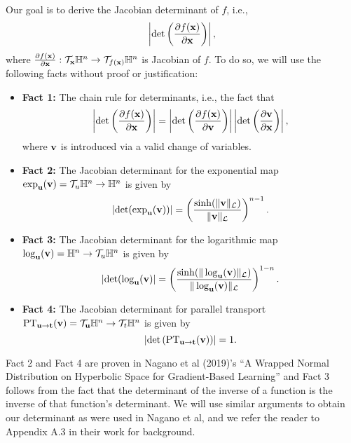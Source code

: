 Our goal is to derive the Jacobian determinant of $f$, i.e., 
\begin{equation}
    \left|\textrm{det}\left(\frac{\partial f(\mathbf{x})}{\partial \mathbf{x}}\right)\right|,
\end{equation}
where $\frac{\partial f(\mathbf{x})}{\partial \mathbf{x}} : \mathcal{T}_{\mathbf{x}}\mathbb{H}^n \rightarrow \mathcal{T}_{f(\mathbf{x})}\mathbb{H}^n$ is Jacobian of $f$.
To do so, we will use the following facts without proof or justification:
\begin{itemize}
    \item 
    \textbf{Fact 1: }The chain rule for determinants, i.e., the fact that
    \begin{equation}
        \left|\textrm{det}\left(\frac{\partial f(\mathbf{x})}{\partial \mathbf{x}}\right)\right| =  \left|\textrm{det}\left(\frac{\partial f(\mathbf{x})}{\partial \mathbf{v}}\right)\right| \left|\textrm{det}\left(\frac{\partial \mathbf{v}}{\partial \mathbf{x}}\right)\right|,
    \end{equation}
    where $\mathbf{v}$ is introduced via a valid change of variables. 
    \item 
    \textbf{Fact 2: } The Jacobian determinant for the exponential map $\exp_{\mathbf{u}}(\mathbf{v}) = \mathcal{T}_{u}\mathbb{H}^n \rightarrow \mathbb{H}^n$ is given by
    \begin{equation}
        \left|\textrm{det}(\exp_{\mathbf{u}}(\mathbf{v}))\right| = \left(\frac{\sinh(\|\mathbf{v}\|_{\mathcal{L}})}{\|\mathbf{v}\|_{\mathcal{L}}}\right)^{n-1}.
    \end{equation}
        \item 
    \textbf{Fact 3: } The Jacobian determinant for the logarithmic map $\log_{\mathbf{u}}(\mathbf{v}) = \mathbb{H}^n \rightarrow \mathcal{T}_u\mathbb{H}^n$ is given by
    \begin{equation}
        \left|\textrm{det}(\log_{\mathbf{u}}(\mathbf{v})\right| = \left(\frac{\sinh(\|\log_{\mathbf{u}}(\mathbf{v})\|_{\mathcal{L}})}{\|\log_{\mathbf{u}}(\mathbf{v})\|_{\mathcal{L}}}\right)^{1-n}.
    \end{equation}
    \item
     \textbf{Fact 4: } The Jacobian determinant for parallel transport $\textnormal{PT}_{\mathbf{u} \rightarrow \mathbf{t}}(\mathbf{v}) = \mathcal{T}_{\mathbf{u}}\mathbb{H}^n \rightarrow \mathcal{T}_t\mathbb{H}^n$ is given by
    \begin{equation}
        \left|\textrm{det}\left(\textnormal{PT}_{\mathbf{u} \rightarrow \mathbf{t}}(\mathbf{v})\right)\right| = 1.
    \end{equation}
\end{itemize}
Fact 2 and Fact 4 are proven in Nagano et al (2019)'s ``A Wrapped Normal Distribution on Hyperbolic Space for Gradient-Based Learning'' and Fact 3 follows from the fact that the determinant of the inverse of a function is the inverse of that function's determinant. 
We will use similar arguments to obtain our determinant as were used in Nagano et al, and we refer the reader to Appendix A.3 in their work for background. 


